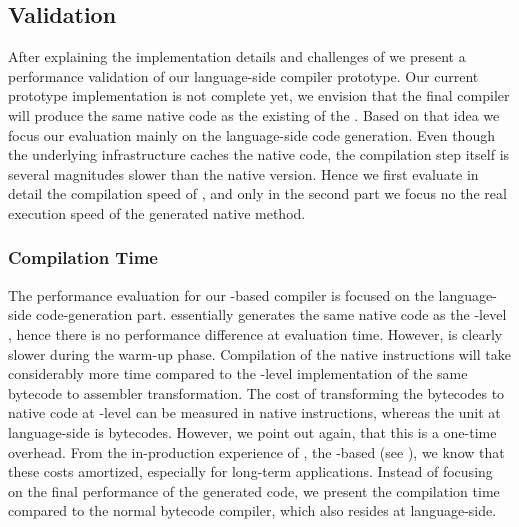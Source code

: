 
\subsection{\NBJ Validation}
After explaining the implementation details and challenges of \NBJ we present a performance validation of our language-side \JIT compiler prototype.
Our current prototype implementation is not complete yet, we envision that the final compiler will produce the same native code as the existing \JIT of the \Cog \VM.
Based on that idea we focus our evaluation mainly on the language-side code generation.
Even though the underlying \B infrastructure caches the native code, the compilation step itself is several magnitudes slower than the native \JIT version.
Hence we first evaluate in detail the compilation speed of \NBJ, and only in the second part we focus no the real execution speed of the generated native method.

\subsubsection*{Compilation Time}

The performance evaluation for our \B-based \JIT compiler is focused on the language-side code-generation part.
\NBJ essentially generates the same native code as the \VM-level \JIT, hence there is no performance difference at evaluation time.
However, \NBJ is clearly slower during the warm-up phase.
Compilation of the native instructions will take considerably more time compared to the \VM-level implementation of the same bytecode to assembler transformation.
The cost of transforming the bytecodes to native code at \VM-level can be measured in native instructions, whereas the unit at language-side is bytecodes.
However, we point out again, that this is a one-time overhead.
From the in-production experience of \NB, the \B-based \FFI (see ), we know that these costs amortized, especially for long-term applications.
Instead of focusing on the final performance of the generated code, we present the compilation time compared to the normal \PH bytecode compiler, which also resides at language-side.

